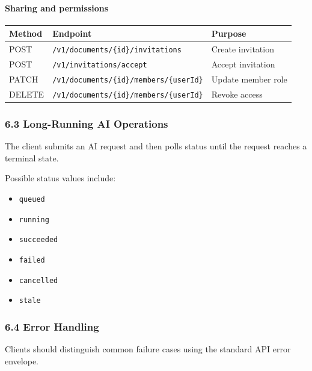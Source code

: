 \documentclass[a4paper]{article}
\providecommand{\tightlist}{%
  \setlength{\itemsep}{0pt}\setlength{\parskip}{0pt}}
\begin{document}
\paragraph{Sharing and permissions}\label{sharing-and-permissions}

\begin{table}[h]
\small
\begin{tabularx}{\textwidth}{@{}L{14mm}L{68mm}Y@{}}
\toprule
Method & Endpoint & Purpose \\
\midrule
POST & \texttt{/v1/documents/\{id\}/invitations} & Create invitation \\
POST & \texttt{/v1/invitations/accept} & Accept invitation \\
PATCH & \texttt{/v1/documents/\{id\}/members/\{userId\}} & Update member role \\
DELETE & \texttt{/v1/documents/\{id\}/members/\{userId\}} & Revoke access \\
\bottomrule
\end{tabularx}
\end{table}

\subsubsection{6.3 Long-Running AI
Operations}\label{63-long-running-ai-operations}

The client submits an AI request and then polls status until the request
reaches a terminal state.

Possible status values include:

\begin{itemize}
\tightlist
\item
  \texttt{queued}
\item
  \texttt{running}
\item
  \texttt{succeeded}
\item
  \texttt{failed}
\item
  \texttt{cancelled}
\item
  \texttt{stale}
\end{itemize}

\subsubsection{6.4 Error Handling}\label{64-error-handling}

Clients should distinguish common failure cases using the standard API
error envelope.
\end{document}
